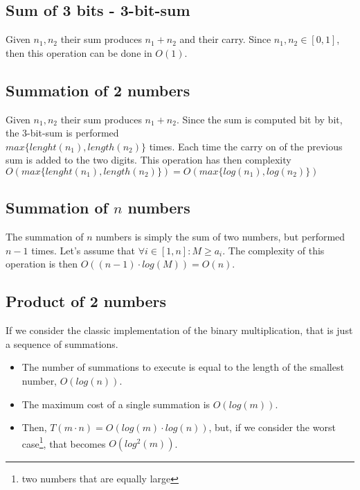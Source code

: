 \documentclass[12pt, a4paper, english]{report}
\begin{document}
\subsection{Sum of 3 bits - 3-bit-sum}
Given $n_{1}, n_{2}$ their sum produces $n_{1} + n_{2}$ and their carry. \newline
Since $n_{1}, n_{2} \in [0,1]$, then this operation can be done in $O(1)$.

\subsection{Summation of 2 numbers}
Given $n_{1}, n_{2}$ their sum produces $n_{1} + n_{2}$. \newline
Since the sum is computed bit by bit, the 3-bit-sum is performed\\$max\{lenght(n_{1}), length(n_{2})\}$ times.\newline
Each time the carry on of the previous sum is added to the two digits. \newline
This operation has then complexity $O(max\{lenght(n_{1}), length(n_{2})\}) = O(max\{log(n_{1}), log(n_{2})\})$

\subsection{Summation of $n$ numbers}
The summation of $n$ numbers is simply the sum of two numbers, but performed $n - 1$ times. \newline
Let's assume that $\forall i \in [1,n]: M \geq a_{i}$. \newline
The complexity of this operation is then $O((n-1) \cdot log(M)) = O(n)$. \newline

\subsection{Product of 2 numbers}
If we consider the classic implementation of the binary multiplication, that is just a sequence of summations. \newline
\begin{itemize}
    \item The number of summations to execute is equal to the length of the smallest number, $O(log(n))$.
    \item The maximum cost of a single summation is $O(log(m))$.
    \item Then, $T(m \cdot n) = O(log(m) \cdot log(n))$, but, if we consider the worst case\footnote{two numbers that are equally large}, that becomes $O(log^{2}(m))$.
\end{itemize}
\end{document}
